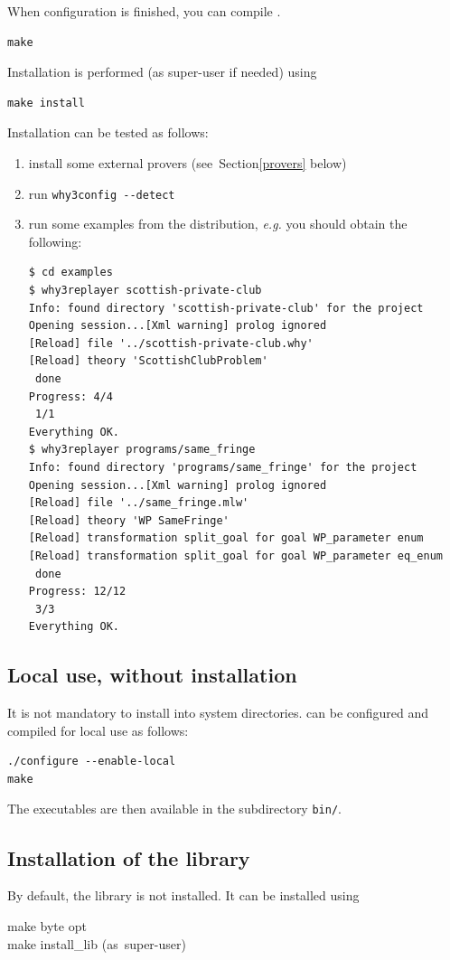 When configuration is finished, you can compile \why.
\begin{verbatim}
make
\end{verbatim}
Installation is performed (as super-user if needed) using
\begin{verbatim}
make install
\end{verbatim}
Installation can be tested as follows: 
\begin{enumerate}
\item install some external provers (see~Section\ref{provers} below)
\item run \verb|why3config --detect|
\item run some examples from the distribution, \emph{e.g.} you should
obtain the following:
\begin{verbatim}
$ cd examples
$ why3replayer scottish-private-club
Info: found directory 'scottish-private-club' for the project
Opening session...[Xml warning] prolog ignored
[Reload] file '../scottish-private-club.why'
[Reload] theory 'ScottishClubProblem'
 done
Progress: 4/4
 1/1
Everything OK.
$ why3replayer programs/same_fringe
Info: found directory 'programs/same_fringe' for the project
Opening session...[Xml warning] prolog ignored
[Reload] file '../same_fringe.mlw'
[Reload] theory 'WP SameFringe'
[Reload] transformation split_goal for goal WP_parameter enum 
[Reload] transformation split_goal for goal WP_parameter eq_enum 
 done
Progress: 12/12
 3/3
Everything OK.
\end{verbatim}
\end{enumerate}

\subsection{Local use, without installation}

It is not mandatory to install \why into system directories.
\why can be configured and compiled for local use as follows:
\begin{verbatim}
./configure --enable-local
make
\end{verbatim}
The \why executables are then available in the subdirectory \texttt{bin/}.

\subsection{Installation of the \why library}
\label{sec:installlib}

By default, the \why library is not installed. It can be installed using
\begin{flushleft}\ttfamily
make byte opt \\
make install\_lib \mbox{\rmfamily (as super-user)}
\end{flushleft}

